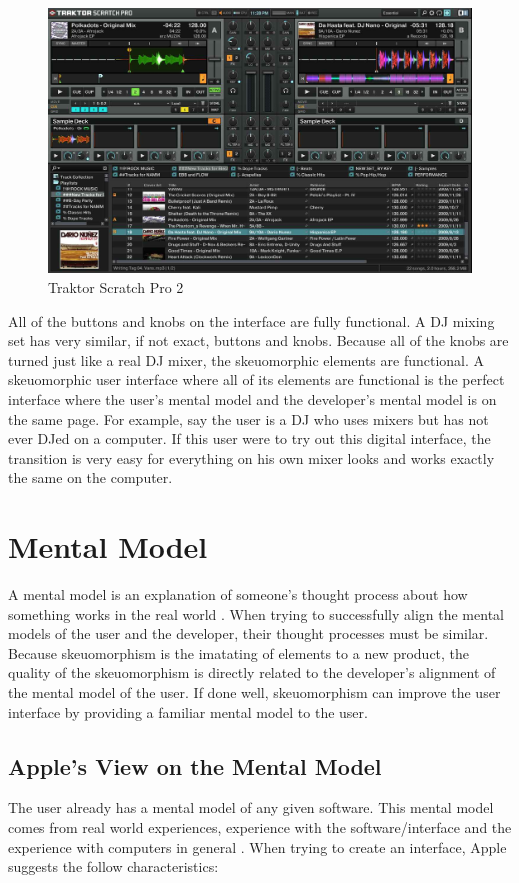 \documentclass{article}
\begin{document}
\begin{figure}[H]
\centering
\includegraphics[width=4.5in]{traktorUI.jpg} 

\caption{Traktor Scratch Pro 2}
\label{traktor}
\end{figure}

All of the buttons and knobs on the interface are fully functional.  A DJ mixing set has very similar, if not exact, buttons and knobs.  Because all of the knobs are turned just like a real DJ mixer, the skeuomorphic elements are functional.  A skeuomorphic user interface where all of its elements are functional is the perfect interface where the user's mental model and the developer's mental model is on the same page.  For example, say the user is a DJ who uses mixers but has not ever DJed on a computer.  If this user were to try out this digital interface, the transition is very easy for everything on his own mixer looks and works exactly the same on the computer.

\section{Mental Model}

A mental model is an explanation of someone's thought process about how something works in the real world \cite{wiki-mental}.  When trying to successfully align the mental models of the user and the developer, their thought processes must be similar.  Because skeuomorphism is the imatating of elements to a new product, the quality of the skeuomorphism is directly related to the developer's alignment of the mental model of the user.  If done well, skeuomorphism can improve the user interface by providing a familiar mental model to the user.

\subsection{Apple's View on the Mental Model}
The user already has a mental model of any given software.  This mental model comes from real world experiences, experience with the software/interface and the experience with computers in general \cite{apple}.  When trying to create an interface, Apple suggests the follow characteristics:
\end{document}
